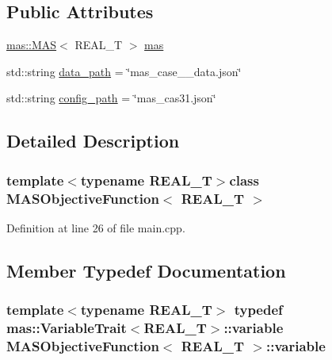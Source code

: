 \subsection*{Public Attributes}
\begin{DoxyCompactItemize}
\item 
\hyperlink{classmas_1_1_m_a_s}{mas\-::\-M\-A\-S}$<$ R\-E\-A\-L\-\_\-\-T $>$ \hyperlink{class_m_a_s_objective_function_acb7a8a71c46a7d51804cc8dd61bd558a}{mas}
\item 
std\-::string \hyperlink{class_m_a_s_objective_function_a829411b4be9bcb22e10e07748ef7b4f1}{data\-\_\-path} = \char`\"{}mas\-\_\-case\-\_\-\_\-data.\-json\char`\"{}
\item 
std\-::string \hyperlink{class_m_a_s_objective_function_a2f79e227571b0ebbf941183aee8be623}{config\-\_\-path} = \char`\"{}mas\-\_\-cas31.\-json\char`\"{}
\end{DoxyCompactItemize}


\subsection{Detailed Description}
\subsubsection*{template$<$typename R\-E\-A\-L\-\_\-\-T$>$class M\-A\-S\-Objective\-Function$<$ R\-E\-A\-L\-\_\-\-T $>$}



Definition at line 26 of file main.\-cpp.



\subsection{Member Typedef Documentation}
\hypertarget{class_m_a_s_objective_function_ab707ad68242cf26ada5f9fd8a0b077f8}{
\subsubsection[{variable}]{\setlength{\rightskip}{0pt plus 5cm}template$<$typename R\-E\-A\-L\-\_\-\-T$>$ typedef {\bf mas\-::\-Variable\-Trait}$<$R\-E\-A\-L\-\_\-\-T$>$\-::{\bf variable} {\bf M\-A\-S\-Objective\-Function}$<$ R\-E\-A\-L\-\_\-\-T $>$\-::{\bf variable}}}\label{class_m_a_s_objective_function_ab707ad68242cf26ada5f9fd8a0b077f8}


